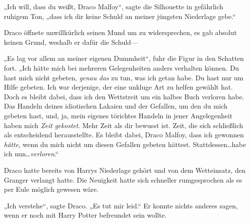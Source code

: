 „Ich will, dass du weißt, Draco Malfoy“, sagte die Silhouette in gefährlich ruhigem Ton, „dass ich dir keine Schuld an meiner jüngsten Niederlage gebe.“

Draco öffnete unwillkürlich seinen Mund um zu widersprechen, es gab absolut keinen Grund, weshalb er dafür die Schuld—

„Es lag vor allem an meiner eigenen Dummheit“, fuhr die Figur in den Schatten fort. „Ich hätte mich bei mehreren Gelegenheiten anders verhalten können. Du hast mich nicht gebeten, \emph{genau das} zu tun, was ich getan habe. Du hast nur um Hilfe gebeten. Ich war derjenige, der eine unkluge Art zu helfen gewählt hat. Doch es bleibt dabei, dass ich den Wettstreit um ein halbes Buch verloren habe. Das Handeln deines idiotischen Lakaien und der Gefallen, um den du mich gebeten hast, und, ja, mein eigenes törichtes Handeln in jener Angelegenheit haben mich \emph{Zeit gekostet}. Mehr Zeit als dir bewusst ist. Zeit, die sich schließlich als entscheidend herausstellte. Es bleibt dabei, Draco Malfoy, dass ich gewonnen \emph{hätte}, wenn du mich nicht um diesen Gefallen gebeten hättest. Stattdessen…habe ich nun…\emph{verloren}.“

Draco hatte bereits von Harrys Niederlage gehört und von dem Wetteinsatz, den Granger verlangt hatte. Die Neuigkeit hatte sich schneller rumgesprochen als es per Eule möglich gewesen wäre.

„Ich verstehe“, sagte Draco. „Es tut mir leid.“ Er konnte nichts anderes sagen, wenn er noch mit Harry Potter befreundet sein wollte.

